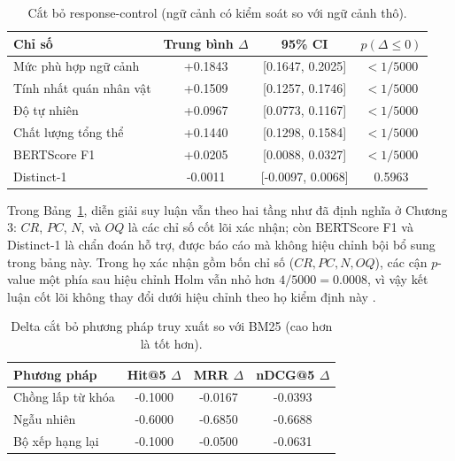 ﻿\documentclass[a4paper,12pt]{article}
\newcommand{\BootstrapSamples}{5000}
\begin{document}
\begin{table}[t]
\centering
\caption{Cắt bỏ response-control (ngữ cảnh có kiểm soát so với ngữ cảnh thô).}
\label{tab:ablation_response_control}
\begingroup
\footnotesize
\setlength{\tabcolsep}{4pt}
\begin{tabular}{lccc}
\toprule
Chỉ số & Trung bình \(\Delta\) & 95\% CI & \(p(\Delta\le0)\) \\
\midrule
Mức phù hợp ngữ cảnh & +0.1843 & [0.1647, 0.2025] & \(<1/\BootstrapSamples\) \\
Tính nhất quán nhân vật & +0.1509 & [0.1257, 0.1746] & \(<1/\BootstrapSamples\) \\
Độ tự nhiên & +0.0967 & [0.0773, 0.1167] & \(<1/\BootstrapSamples\) \\
Chất lượng tổng thể & +0.1440 & [0.1298, 0.1584] & \(<1/\BootstrapSamples\) \\
BERTScore F1 & +0.0205 & [0.0088, 0.0327] & \(<1/\BootstrapSamples\) \\
Distinct-1 & -0.0011 & [-0.0097, 0.0068] & 0.5963 \\
\bottomrule
\end{tabular}
\endgroup
\end{table}

Trong Bảng~\ref{tab:ablation_response_control}, diễn giải suy luận vẫn theo hai tầng như đã định nghĩa ở Chương 3: \(CR\), \(PC\), \(N\), và \(OQ\) là các chỉ số cốt lõi xác nhận; còn BERTScore F1 và Distinct-1 là chẩn đoán hỗ trợ, được báo cáo mà không hiệu chỉnh bội bổ sung trong bảng này.
Trong họ xác nhận gồm bốn chỉ số (\(CR,PC,N,OQ\)), các cận \(p\)-value một phía sau hiệu chỉnh Holm vẫn nhỏ hơn \(4/\BootstrapSamples=0.0008\), vì vậy kết luận cốt lõi không thay đổi dưới hiệu chỉnh theo họ kiểm định này \cite{Holm1979}.

\begin{table}[t]
\centering
\caption{Delta cắt bỏ phương pháp truy xuất so với BM25 (cao hơn là tốt hơn).}
\label{tab:ablation_retrieval}
\begingroup
\footnotesize
\setlength{\tabcolsep}{4pt}
\begin{tabular}{lccc}
\toprule
Phương pháp & Hit@5 \(\Delta\) & MRR \(\Delta\) & nDCG@5 \(\Delta\) \\
\midrule
Chồng lấp từ khóa & -0.1000 & -0.0167 & -0.0393 \\
Ngẫu nhiên & -0.6000 & -0.6850 & -0.6688 \\
Bộ xếp hạng lại & -0.1000 & -0.0500 & -0.0631 \\
\bottomrule
\end{tabular}
\endgroup
\end{table}
\end{document}
